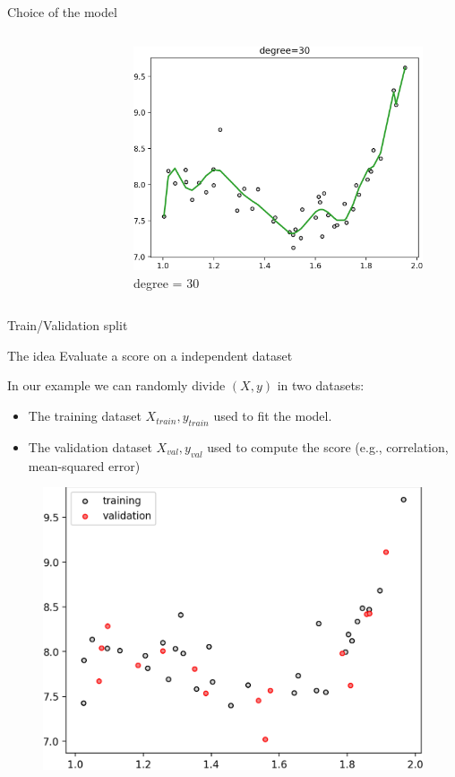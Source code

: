 \documentclass[handout, 10pt]{beamer}
\begin{document}
\begin{frame}{Choice of the model}
\begin{columns}
\begin{figure}
    \end{figure}
\pause
    \begin{figure}
    \caption*{degree = 30 }
    \includegraphics[width=\textwidth]{fig/L1/interp-pol-30.png}
    \end{figure}
 
\end{columns}
   
\end{frame}


\begin{frame}{Train/Validation split}
\begin{block}{The idea}
Evaluate a score on a independent dataset
\end{block}
\pause
In our example we can randomly divide $(X,y)$ in two datasets:
\begin{itemize}
    \item The training dataset $X_{train},y_{train}$ used to fit the  model.
    \item The validation dataset $X_{val},y_{val}$ used to compute the score (e.g., correlation, mean-squared error)
\end{itemize}

    \begin{figure}
    \includegraphics[width=.4\textwidth]{fig/L1/datasplit.png}
    \end{figure}

\end{frame}
\end{document}
